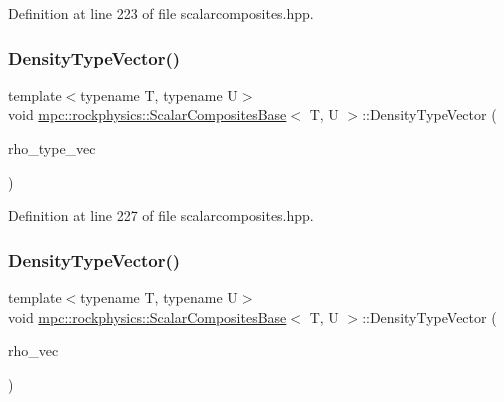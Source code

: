 Definition at line 223 of file scalarcomposites.\+hpp.

\mbox{\label{classmpc_1_1rockphysics_1_1_scalar_composites_base_af1816d0fc643a2b28f64a7bef9d883ca}} 
\subsubsection{\texorpdfstring{Density\+Type\+Vector()}{DensityTypeVector()}\hspace{0.1cm}{\footnotesize\ttfamily [2/3]}}
{\footnotesize\ttfamily template$<$typename T, typename U$>$ \\
void \mbox{\hyperlink{classmpc_1_1rockphysics_1_1_scalar_composites_base}{mpc\+::rockphysics\+::\+Scalar\+Composites\+Base}}$<$ T, U $>$\+::Density\+Type\+Vector (\begin{DoxyParamCaption}\item[{std\+::vector$<$ \mbox{\hyperlink{structmpc_1_1rockphysics_1_1_density_type}{mpc\+::rockphysics\+::\+Density\+Type}}$<$ T $>$ $>$}]{rho\+\_\+type\+\_\+vec }\end{DoxyParamCaption})\hspace{0.3cm}{\ttfamily [inline]}}



Definition at line 227 of file scalarcomposites.\+hpp.

\mbox{\label{classmpc_1_1rockphysics_1_1_scalar_composites_base_ad5f467744173a292381953a3e6837aa7}} 
\subsubsection{\texorpdfstring{Density\+Type\+Vector()}{DensityTypeVector()}\hspace{0.1cm}{\footnotesize\ttfamily [3/3]}}
{\footnotesize\ttfamily template$<$typename T, typename U$>$ \\
void \mbox{\hyperlink{classmpc_1_1rockphysics_1_1_scalar_composites_base}{mpc\+::rockphysics\+::\+Scalar\+Composites\+Base}}$<$ T, U $>$\+::Density\+Type\+Vector (\begin{DoxyParamCaption}\item[{std\+::vector$<$ T $>$ \&}]{rho\+\_\+vec }\end{DoxyParamCaption})\hspace{0.3cm}{\ttfamily [inline]}}



